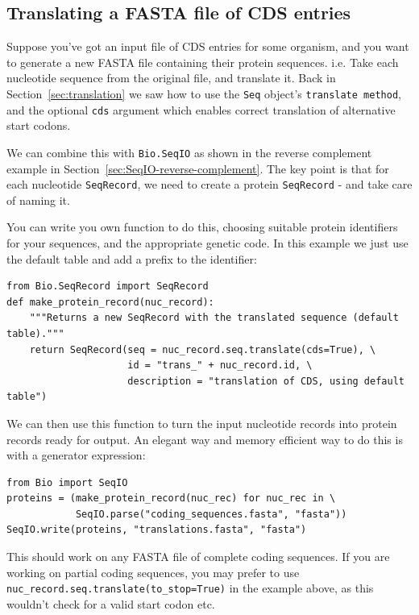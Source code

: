 \documentclass{report}
\begin{document}
\subsection{Translating a FASTA file of CDS entries}
\label{sec:SeqIO-translate}
Suppose you've got an input file of CDS entries for some organism, and you
want to generate a new FASTA file containing their protein sequences.  i.e.
Take each nucleotide sequence from the original file, and translate it.
Back in Section~\ref{sec:translation} we saw how to use the \verb|Seq|
object's \verb|translate method|, and the optional \verb|cds| argument
which enables correct translation of alternative start codons.

We can combine this with \verb|Bio.SeqIO| as
shown in the reverse complement example in Section~\ref{sec:SeqIO-reverse-complement}.
The key point is that for each nucleotide \verb|SeqRecord|, we need to create
a protein \verb|SeqRecord| - and take care of naming it.

You can write you own function to do this, choosing suitable protein identifiers
for your sequences, and the appropriate genetic code.  In this example we just
use the default table and add a prefix to the identifier:

\begin{verbatim}
from Bio.SeqRecord import SeqRecord
def make_protein_record(nuc_record):
    """Returns a new SeqRecord with the translated sequence (default table)."""
    return SeqRecord(seq = nuc_record.seq.translate(cds=True), \
                     id = "trans_" + nuc_record.id, \
                     description = "translation of CDS, using default table")
\end{verbatim}

We can then use this function to turn the input nucleotide records into protein
records ready for output.  An elegant way and memory efficient way to do this
is with a generator expression:

\begin{verbatim}
from Bio import SeqIO
proteins = (make_protein_record(nuc_rec) for nuc_rec in \
            SeqIO.parse("coding_sequences.fasta", "fasta"))
SeqIO.write(proteins, "translations.fasta", "fasta")
\end{verbatim}

This should work on any FASTA file of complete coding sequences.
If you are working on partial coding sequences, you may prefer to use
\verb|nuc_record.seq.translate(to_stop=True)| in the example above, as
this wouldn't check for a valid start codon etc.
\end{document}
